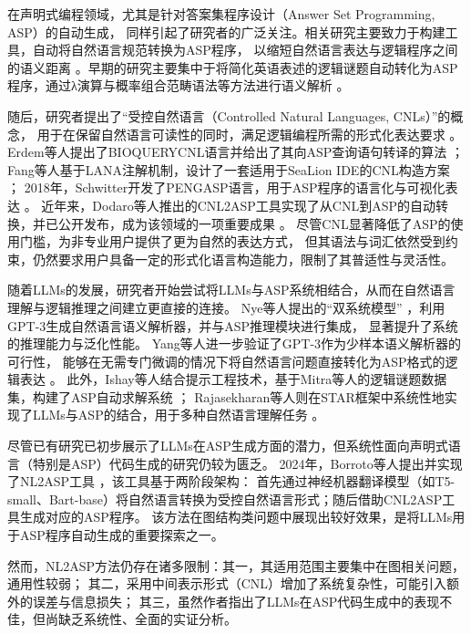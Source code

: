 在声明式编程领域，尤其是针对答案集程序设计（Answer Set Programming, ASP）的自动生成，
同样引起了研究者的广泛关注。相关研究主要致力于构建工具，自动将自然语言规范转换为ASP程序，
以缩短自然语言表达与逻辑程序之间的语义距离 \cite{erdem2009transforming}\cite{fang2017approach}\cite{schwitter2018specifying}\cite{caruso2024cnl2asp}。早期的研究主要集中于将简化英语表述的逻辑谜题自动转化为ASP程序，通过λ演算与概率组合范畴语法等方法进行语义解析 \cite{baral2012solving}。

随后，研究者提出了“受控自然语言（Controlled Natural Languages, CNLs）”的概念，
用于在保留自然语言可读性的同时，满足逻辑编程所需的形式化表达要求 \cite{kuhn2014survey}。
Erdem等人提出了BIOQUERYCNL语言并给出了其向ASP查询语句转译的算法 \cite{erdem2009transforming}；
Fang等人基于LANA注解机制，设计了一套适用于SeaLion IDE的CNL构造方案 \cite{fang2017approach}；
2018年，Schwitter开发了PENGASP语言，用于ASP程序的语言化与可视化表达 \cite{schwitter2018specifying}。
近年来，Dodaro等人推出的CNL2ASP工具实现了从CNL到ASP的自动转换，并已公开发布，成为该领域的一项重要成果 \cite{caruso2024cnl2asp}。
尽管CNL显著降低了ASP的使用门槛，为非专业用户提供了更为自然的表达方式，
但其语法与词汇依然受到约束，仍然要求用户具备一定的形式化语言构造能力，限制了其普适性与灵活性。

随着LLMs的发展，研究者开始尝试将LLMs与ASP系统相结合，从而在自然语言理解与逻辑推理之间建立更直接的连接。
Nye等人提出的“双系统模型” \cite{nye2021improving}，利用GPT-3生成自然语言语义解析器，并与ASP推理模块进行集成，
显著提升了系统的推理能力与泛化性能。
Yang等人进一步验证了GPT-3作为少样本语义解析器的可行性，
能够在无需专门微调的情况下将自然语言问题直接转化为ASP格式的逻辑表达 \cite{yang2023coupling}。
此外，Ishay等人结合提示工程技术，基于Mitra等人的逻辑谜题数据集，构建了ASP自动求解系统 \cite{mitra2016addressing}；
Rajasekharan等人则在STAR框架中系统性地实现了LLMs与ASP的结合，用于多种自然语言理解任务 \cite{rajasekharan2023reliable}。

尽管已有研究已初步展示了LLMs在ASP生成方面的潜力，但系统性面向声明式语言（特别是ASP）代码生成的研究仍较为匮乏。
2024年，Borroto等人提出并实现了NL2ASP工具 \cite{borroto2024automaticcompositionaspprograms}，该工具基于两阶段架构：
首先通过神经机器翻译模型（如T5-small、Bart-base）将自然语言转换为受控自然语言形式；随后借助CNL2ASP工具生成对应的ASP程序。
该方法在图结构类问题中展现出较好效果，是将LLMs用于ASP程序自动生成的重要探索之一。

然而，NL2ASP方法仍存在诸多限制：其一，其适用范围主要集中在图相关问题，通用性较弱；
其二，采用中间表示形式（CNL）增加了系统复杂性，可能引入额外的误差与信息损失；
其三，虽然作者指出了LLMs在ASP代码生成中的表现不佳，但尚缺乏系统性、全面的实证分析。

